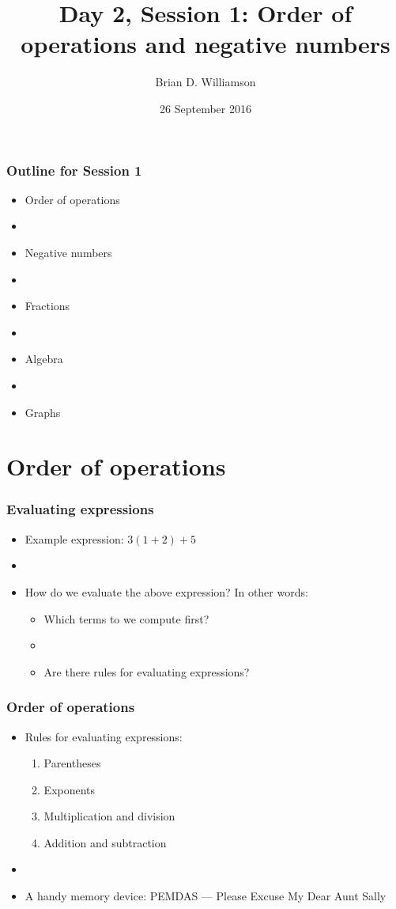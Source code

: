 \documentclass[12pt]{beamer}
\title{Day 2, Session 1: Order of operations and negative numbers}
\author{Brian D. Williamson}
\institute{EPI/BIOST Bootcamp 2016}
\date{26 September 2016}
\newcommand{\myframe}[1]{\begin{frame} \frametitle{#1}}
\begin{document}
\begin{frame}
\titlepage
\end{frame}

\myframe{Outline for Session 1}
\begin{itemize}
\item Order of operations
\item[]
\item Negative numbers 
\item[]
\item Fractions
\item[]
\item Algebra
\item[]
\item Graphs
\end{itemize}
\end{frame}

\section{Order of operations}
\myframe{Evaluating expressions}
\begin{itemize}
\item Example expression: $3(1 + 2) + 5$
\item[]
\item How do we evaluate the above expression? In other words:
\begin{itemize}
\item Which terms to we compute first?
\item[]
\item Are there rules for evaluating expressions?
\end{itemize}
\end{itemize}
\end{frame}

\myframe{Order of operations}
\begin{itemize}
\item Rules for evaluating expressions:
\begin{enumerate}
\item Parentheses
\item Exponents
\item Multiplication and division
\item Addition and subtraction
\end{enumerate}
\item[]
\item A handy memory device: PEMDAS --- Please Excuse My Dear Aunt Sally
\end{itemize}
\end{frame}
\end{document}
